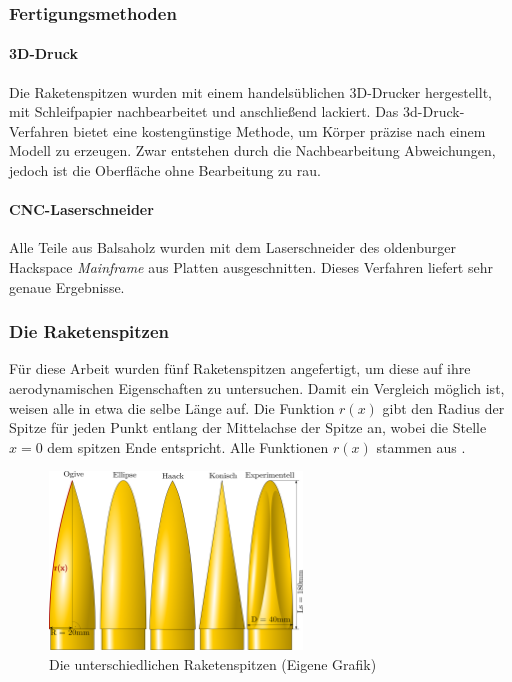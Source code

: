 \documentclass[10pt,a4paper]{article}
\begin{document}
\subsubsection{Fertigungsmethoden}
\label{sssec-Fertigungsmethoden}

\paragraph{3D-Druck}
Die Raketenspitzen wurden mit einem handelsüblichen 3D-Drucker hergestellt, mit Schleifpapier nachbearbeitet und anschließend lackiert. Das 3d-Druck-Verfahren bietet eine kostengünstige Methode, um Körper präzise nach einem Modell zu erzeugen. Zwar entstehen durch die Nachbearbeitung Abweichungen, jedoch ist die Oberfläche ohne Bearbeitung zu rau.

\paragraph{CNC-Laserschneider}
Alle Teile aus Balsaholz wurden mit dem Laserschneider des oldenburger Hackspace \emph{Mainframe} aus Platten ausgeschnitten. Dieses Verfahren liefert sehr genaue Ergebnisse.


\subsubsection{Die Raketenspitzen}
\label{sssec-Reketenspitzen}
Für diese Arbeit wurden fünf Raketenspitzen angefertigt, um diese auf ihre aerodynamischen Eigenschaften zu untersuchen. Damit ein Vergleich möglich ist, weisen alle in etwa die selbe Länge auf.
Die Funktion $r(x)$ gibt den Radius der Spitze für jeden Punkt entlang der Mittelachse der Spitze an, wobei die Stelle $x=0$ dem spitzen Ende entspricht. Alle Funktionen $r(x)$ stammen aus \cite{sn}.

\begin{figure}[h]
	\centering
	\includegraphics[width=0.6\textwidth]{Bilder/Raketenspitzen.png}
	\caption{Die unterschiedlichen Raketenspitzen (Eigene Grafik)}
	\label{fig-Raketenspitzen}
\end{figure}
\end{document}
